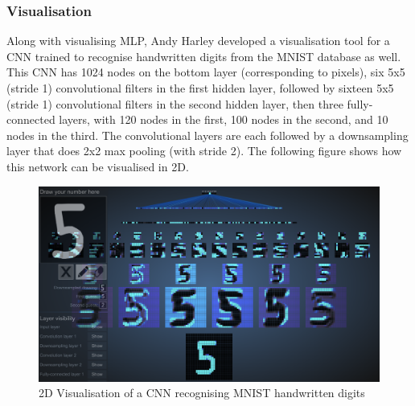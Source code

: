 \subsubsection{Visualisation}
\label{sect5_1_2_2}
Along with visualising \ac{MLP}, Andy Harley developed a visualisation tool for a CNN trained to recognise handwritten digits from the MNIST database \cite{harley2015isvc} as well. \newline\newline
This CNN has 1024 nodes on the bottom layer (corresponding to pixels), six 5x5 (stride 1) convolutional filters in the first hidden layer, followed by sixteen 5x5 (stride 1) convolutional filters in the second hidden layer, then three fully-connected layers, with 120 nodes in the first, 100 nodes in the second, and 10 nodes in the third. The convolutional layers are each followed by a downsampling layer that does 2x2 max pooling (with stride 2)\cite{harley2015isvc}. \newline\newline
The following figure shows how this network can be visualised in 2D.

\begin{figure}[h!]
\centering
\includegraphics[width=13cm]{figures/ConvNet_2D.png}
\caption{2D Visualisation of a CNN recognising MNIST handwritten digits \cite{harley2015isvc}}
\label{fig:cnn12}
\end{figure}

